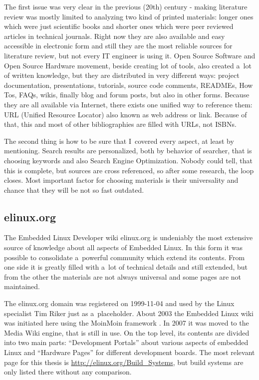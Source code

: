 \documentclass[printmode]{mgr}
\begin{document}
The first issue was very clear in the previous (20th) century - making literature review was mostly limited to analyzing two kind of printed materials: longer ones which were just scientific books and shorter ones which were peer reviewed articles in technical journals.
Right now they are also available and easy accessible in electronic form and still they are the most reliable sources for literature review, but not every IT engineer is using it.
Open Source Software and Open Source Hardware movement, beside creating lot of tools, also created a~lot of written knowledge, but they are distributed in very different ways: project documentation, presentations, tutorials, source code comments, READMEs, How Tos, FAQs, wikis, finally blog and forum posts, but also in other forms.
Because they are all available via Internet, there exists one unified way to reference them: URL (Unified Resource Locator) also known as web address or link.
Because of that, this and most of other bibliographies are filled with URLs, not ISBNs.

The second thing is how to be sure that I~covered every aspect, at least by mentioning. Search results are personalized, both by behavior of searcher, that is choosing keywords and also Search Engine Optimization.
Nobody could tell, that this is complete, but sources are cross referenced, so after some research, the loop closes.
Most important factor for choosing materials is their universality and chance that they will be not so fast outdated.

\subsection*{elinux.org}

The Embedded Linux Developer wiki elinux.org is undeniably the most extensive source of knowledge about all aspects of Embedded Linux.
In this form it was possible to consolidate a~powerful community which extend its contents.
From one side it is greatly filled with a~lot of technical details and still extended, but from the other the materials are not always universal and some pages are not maintained.

The elinux.org domain was registered on 1999-11-04 \cite{web:whois-elinux} and used by the Linux specialist Tim Riker just as a~placeholder.\cite{web:riker}\cite{web:elinux-placeholder}
About 2003 the Embedded Linux wiki was initiated here using the MoinMoin framework \cite{web:elinux-moinmoin}.
In 2007 it was moved to the Media Wiki engine, that is still in use.
On the top level, its contents are divided into two main parts: ``Development Portals'' about various aspects of embedded Linux and ``Hardware Pages'' for different development boards.
The most relevant page for this thesis is \url{http://elinux.org/Build_Systems}, but build systems are only listed there without any comparison.
\end{document}
